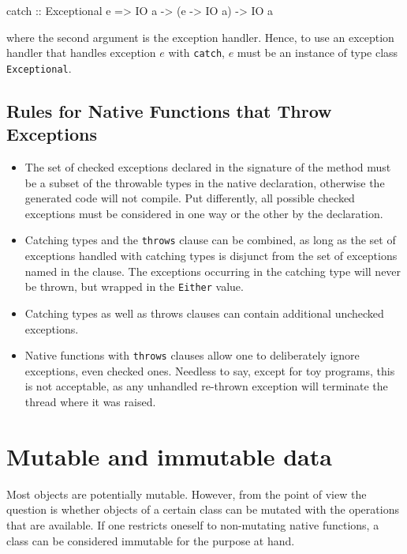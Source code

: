 \begin{code}
catch :: Exceptional e => IO a -> (e -> IO a) -> IO a
\end{code}

where the second argument is the exception handler. Hence, to use an exception handler that handles exception $e$ with \texttt{catch}, $e$ must be an instance of type class \texttt{Exceptional}.

\subsection*{Rules for Native Functions that Throw Exceptions}

\begin{itemize}
\item The set of checked exceptions declared in the signature of the \java{} method must be a subset of the throwable types in the native declaration, otherwise the generated \java{} code will not compile. Put differently, 
all possible checked exceptions must be considered in one way or the other by the \frege{} declaration.
\item Catching types and the \texttt{throws} clause can be combined, as long as the set of exceptions handled with catching types is disjunct from the set of exceptions named in the  clause. The exceptions occurring in the catching type will never be thrown, but wrapped in the \texttt{Either} value.
\item Catching types as well as throws clauses can contain additional unchecked exceptions.
\item Native functions with \texttt{throws} clauses allow one to deliberately ignore exceptions, even checked ones.
Needless to say, except for toy programs, this is not acceptable, as 
any unhandled re-thrown exception will terminate the thread where it was raised.
\end{itemize}

\section{Mutable and immutable \java{} data} \label{mutable-immutable-data}

Most \java{} objects are potentially mutable. 
However, from the \frege{} point of view the question is whether objects of a certain class can be mutated with the operations that are available. If one restricts oneself to non-mutating native functions, 
a \java{} class can be considered immutable for the purpose at hand. 

